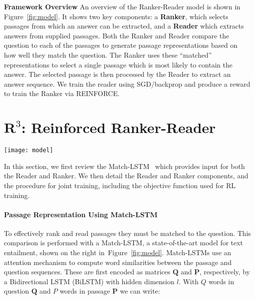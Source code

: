 \documentclass[letterpaper]{article} %
\begin{document}
\noindent\textbf{Framework Overview} \quad
An overview of the Ranker-Reader model is shown in Figure~\ref{fig:model}. It shows two key components: a \textbf{Ranker}, which selects passages from which an answer can be extracted, and a \textbf{Reader} which extracts answers from supplied passages.  Both the Ranker and Reader %
compare the question to each of the passages to generate passage representations based on how well they match the question. The Ranker uses these ``matched'' representations to select a single passage which is %
most likely to contain the answer.  The selected passage is then processed by the Reader to extract an answer sequence.  %
We train the reader using SGD/backprop and produce a reward to train the Ranker via REINFORCE. 

\section{$\textbf{R}^{3}$: Reinforced Ranker-Reader}
\label{sec:method}


\begin{figure*}[t]
\centering
\texttt{[image: model]}

\caption{Overview of training our model, comprising a Ranker and a Reader based on Match-LSTM as shown on the right side. The Ranker selects a passage $\tau$ and the Reader predicts the start and end positions of the answer in $\tau$. The reward for the Ranker depends on similarity of the extracted answer with the ground-truth answer $\mathbf{a}^g$. To accelerate Reader convergence,
we also sample several negative passages without ground-truth answer.}
\label{fig:model}
\end{figure*}

In this section, we first review the Match-LSTM~\cite{wang2015learning:NAACL2016} which %
provides input for both the Reader and Ranker. We then detail the Reader and Ranker components, and the procedure for joint training, including the objective function used for RL training.


\paragraph{Passage Representation Using Match-LSTM}
To effectively rank and read passages they must be matched to the question.  This comparison is performed with a Match-LSTM, a state-of-the-art model for text entailment, shown on the right in~Figure~\ref{fig:model}. Match-LSTMs use an attention mechanism to compute word similarities between the passage and question sequences.  These are first encoded as matrices $\mathbf{Q}$ and $\mathbf{P}$, respectively, by a Bidirectional LSTM (BiLSTM) with hidden dimension $l$.  With $Q$ words in question $\mathbf{Q}$ and $P$ words in passage $\mathbf{P}$ we can write:
\end{document}
